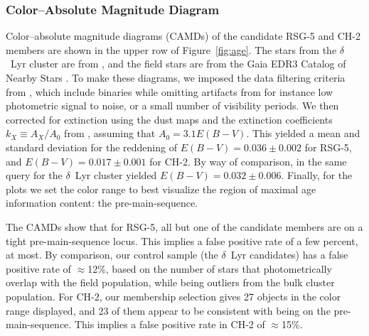 \documentclass[12pt,twocolumn]{aastex63}
\begin{document}
\subsubsection{Color--Absolute Magnitude Diagram}
\label{sec:camd}

Color--absolute magnitude diagrams (CAMDs) of the candidate RSG-5 and
CH-2 members are shown in the upper row of Figure~\ref{fig:age}.  The
stars from the $\delta$~Lyr cluster are from
\citet{bouma_kep1627_2022}, and the field stars are from the Gaia EDR3
Catalog of Nearby Stars \citep{gaia_gcns_2021}.  To make these
diagrams, we imposed the data filtering criteria from
\citet{GaiaCollaboration2018}, which include binaries
while omitting artifacts from for instance low
photometric signal to noise, or a small number of visibility periods.
We then corrected for extinction using the
\citet{lallement_threedimensional_2018} dust
maps and the extinction
coefficients $k_X\equiv A_X/A_0$ from \citet{GaiaCollaboration2018},
assuming that $A_0 = 3.1 E(B-V)$.  This yielded a mean and standard
deviation for the reddening of $E(B-V)=0.036\pm0.002$ for RSG-5, and
$E(B-V)=0.017\pm0.001$ for CH-2.  By way of comparison, in
\citet{bouma_kep1627_2022} the same query for the $\delta$~Lyr cluster
yielded $E(B-V)=0.032\pm0.006$.  Finally, for the plots we set the
color range to best visualize the region of maximal age information
content: the pre-main-sequence.

The CAMDs show that for RSG-5, all but one of the candidate
members are on a tight pre-main-sequence locus.  This implies a false
positive rate of a few percent, at most.  By comparison, our control
sample (the $\delta$~Lyr candidates) has a false positive rate of
$\approx$12\%, based on the number of stars that photometrically
overlap with the field population, while being outliers from the bulk
cluster population.  For CH-2, our membership selection gives 27
objects in the color range displayed, and 23 of them appear to be
consistent with being on the pre-main-sequence.  This implies a false
positive rate in CH-2 of $\approx$15\%.
\end{document}
